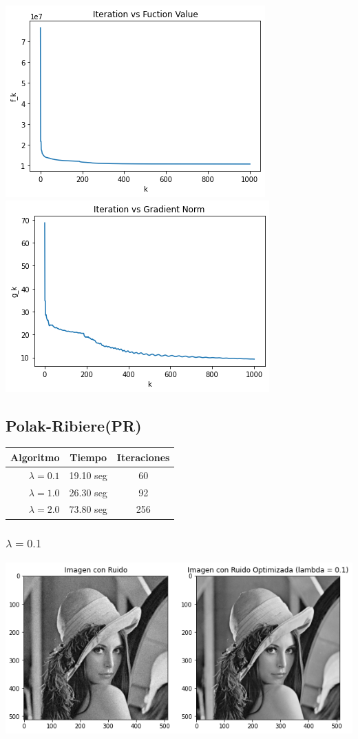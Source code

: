 \documentclass[11pt,letterpaper]{article}
\theoremstyle{definition}
\theoremstyle{definition}
\theoremstyle{definition}
\begin{document}
\begin{center}
	\includegraphics[width=0.6\linewidth]{graficas/fr/funcion_2}
	\includegraphics[width=0.6\linewidth]{graficas/fr/gradiente_2}
\end{center}


\subsection{Polak-Ribiere(PR)}
\begin{center}
	\begin{tabular}{rcc}
		\hline
		\hline
		Algoritmo          & Tiempo       & Iteraciones \\
		\hline
		\hline
		$ \lambda = 0.1 $ & 19.10 seg &    60          \\
		$ \lambda = 1.0 $ & 26.30 seg &    92          \\
		$ \lambda = 2.0 $ & 73.80 seg &    256         \\
		\hline
	\end{tabular}
\end{center}
\subsubsection{$ \lambda = 0.1 $}
\begin{center}
	\includegraphics[width=0.75\linewidth]{graficas/pr/optimizada_0}
\end{center}
\end{document}
